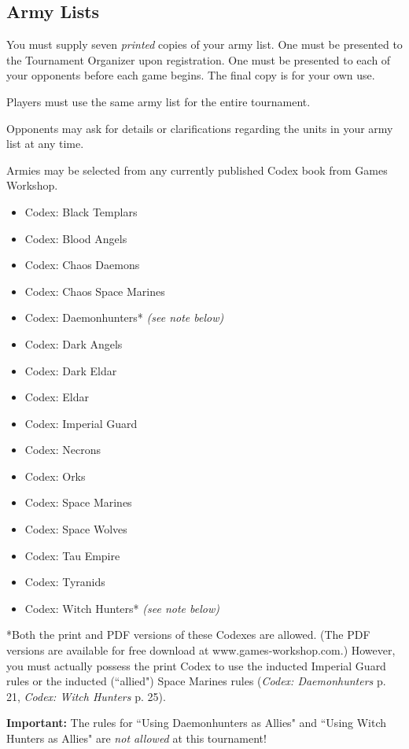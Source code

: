 \documentclass[12pt,titlepage]{article}
\begin{document}
\subsection*{Army Lists}

You must supply seven \textit{printed} copies of your army list. One must be presented to the Tournament Organizer upon registration. One must be presented to each of your opponents before each game begins. The final copy is for your own use.

Players must use the same army list for the entire tournament.

Opponents may ask for details or clarifications regarding the units in your army list at any time.

Armies may be selected from any currently published Codex book from Games Workshop.
\newpage
\begin{itemize}
\item Codex: Black Templars
\item Codex: Blood Angels
\item Codex: Chaos Daemons
\item Codex: Chaos Space Marines
\item Codex: Daemonhunters* \textit{(see note below)}
\item Codex: Dark Angels
\item Codex: Dark Eldar
\item Codex: Eldar
\item Codex: Imperial Guard
\item Codex: Necrons
\item Codex: Orks
\item Codex: Space Marines
\item Codex: Space Wolves
\item Codex: Tau Empire
\item Codex: Tyranids
\item Codex: Witch Hunters* \textit{(see note below)}
\end{itemize}

*Both the print and PDF versions of these Codexes are allowed. (The PDF versions are available for free download at www.games-workshop.com.) However, you must actually possess the print Codex to use the inducted Imperial Guard rules or the inducted (``allied") Space Marines rules (\textit{Codex: Daemonhunters} p. 21, \textit{Codex: Witch Hunters} p. 25).

\textbf{Important:} The rules for ``Using Daemonhunters as Allies" and ``Using Witch Hunters as Allies" are \textit{not allowed} at this tournament!
\end{document}
